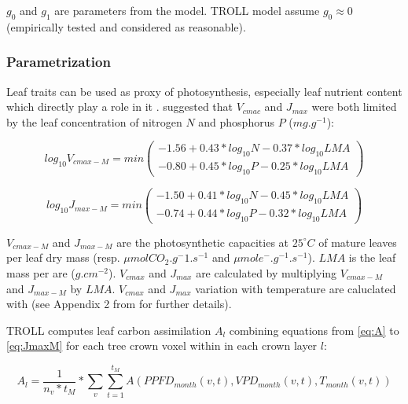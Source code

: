 \documentclass[]{article}
\theoremstyle{definition}
\theoremstyle{definition}
\theoremstyle{remark}
\begin{document}
\(g_0\) and \(g_1\) are parameters from the model. TROLL model assume
\(g_0 \approx 0\) (empirically tested and considered as reasonable).

\subsubsection{Parametrization}\label{parametrization}

Leaf traits can be used as proxy of photosynthesis, especially leaf
nutrient content which directly play a role in it
\citep{wright_worldwide_2004}. \citet{Domingues2010} suggested that
\(V_{cmac}\) and \(J_{max}\) were both limited by the leaf concentration
of nitrogen \(N\) and phosphorus \(P\) (\(mg.g^{-1}\)):

\begin{equation}
  log_{10} V_{cmax-M} = min( 
  \begin{array}{c} 
    -1.56+0.43*log_{10} N-0.37*log_{10} LMA \\
    -0.80+0.45*log_{10} P-0.25*log_{10} LMA 
  \end{array} 
  )
  \label{eq:VcmaxM}
\end{equation}

\begin{equation}
  log_{10} J_{max-M} = min(
  \begin{array}{c} 
    -1.50+0.41*log_{10} N-0.45*log_{10} LMA \\
    -0.74+0.44*log_{10} P-0.32*log_{10} LMA 
  \end{array}
  )
  \label{eq:JmaxM}
\end{equation}

\(V_{cmax-M}\) and \(J_{max-M}\) are the photosynthetic capacities at
\(25^\circ C\) of mature leaves per leaf dry mass (resp.
\(\mu mol CO_2.g^-1.s^{-1}\) and \(\mu mol e^-.g^{-1}.s^{-1}\)). \(LMA\)
is the leaf mass per are (\(g.cm^{-2}\)). \(V_{cmax}\) and \(J_{max}\)
are calculated by multiplying \(V_{cmax-M}\) and \(J_{max-M}\) by
\(LMA\). \(V_{cmax}\) and \(J_{max}\) variation with temperature are
caluclated with \citet{Bernacchi2003} (see Appendix 2 from \citet{Li}
for further details).

TROLL computes leaf carbon assimilation \(A_l\) combining equations from
\eqref{eq:A} to \eqref{eq:JmaxM} for each tree crown voxel within in each
crown layer \(l\):

\begin{equation}
  A_l = \frac{1}{n_v*t_M} * \sum_v  \sum^{t_M}_{t=1} A(PPFD_{month}(v,t),VPD_{month}(v,t),T_{month}(v,t))
  \label{eq:Al}
\end{equation}
\end{document}
